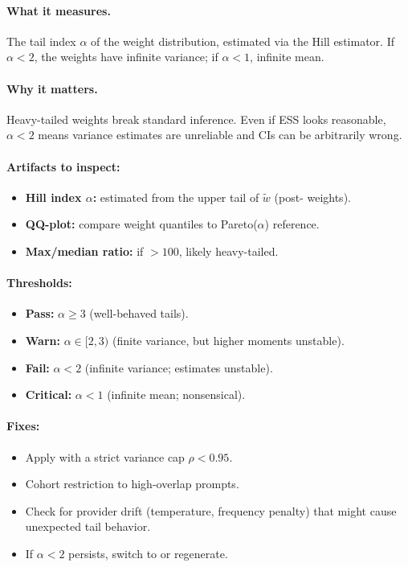 \paragraph{What it measures.} The tail index $\alpha$ of the weight distribution, estimated via the Hill estimator. If $\alpha < 2$, the weights have infinite variance; if $\alpha < 1$, infinite mean.

\paragraph{Why it matters.} Heavy-tailed weights break standard inference. Even if ESS looks reasonable, $\alpha < 2$ means variance estimates are unreliable and CIs can be arbitrarily wrong.

\paragraph{Artifacts to inspect:}
\begin{itemize}
\item \textbf{Hill index $\alpha$:} estimated from the upper tail of $\tilde{w}$ (post-\simcal{} weights).
\item \textbf{QQ-plot:} compare weight quantiles to Pareto($\alpha$) reference.
\item \textbf{Max/median ratio:} if $> 100$, likely heavy-tailed.
\end{itemize}

\paragraph{Thresholds:}
\begin{itemize}
\item \textbf{Pass:} $\alpha \ge 3$ (well-behaved tails).
\item \textbf{Warn:} $\alpha \in [2, 3)$ (finite variance, but higher moments unstable).
\item \textbf{Fail:} $\alpha < 2$ (infinite variance; estimates unstable).
\item \textbf{Critical:} $\alpha < 1$ (infinite mean; nonsensical).
\end{itemize}

\paragraph{Fixes:}
\begin{itemize}
\item Apply \simcal{} with a strict variance cap $\rho < 0.95$.
\item Cohort restriction to high-overlap prompts.
\item Check for provider drift (temperature, frequency penalty) that might cause unexpected tail behavior.
\item If $\alpha < 2$ persists, switch to \dr{} or regenerate.
\end{itemize}

